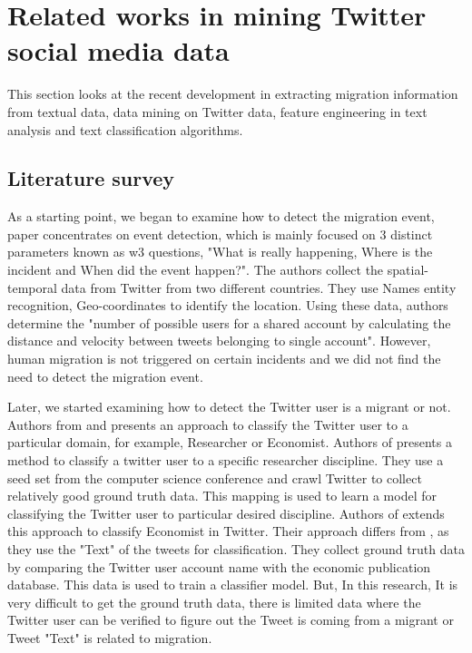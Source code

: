 


\section{Related works in mining Twitter social media data}

This section looks at the recent development in extracting migration information from textual data, data mining on Twitter data, feature engineering in text analysis and text classification algorithms.

\subsection{Literature survey}

As a starting point, we began to examine how to detect the migration event, \cite{Goergen} paper concentrates on event detection, which is mainly focused on 3 distinct parameters
known as w3 questions, "What is really happening, Where is the incident and When did the
event happen?". The authors collect the spatial-temporal data from Twitter from two different
countries. They use Names entity recognition, Geo-coordinates to identify the location. Using these
data, authors determine the "number of possible users for a shared account by calculating the
distance and velocity between tweets belonging to single account". However, human migration is not triggered on certain incidents and we did not find the need to detect the migration event. 

Later, we started examining how to detect the Twitter user is a migrant or not. Authors from \cite{Hadgu} and  \cite{Böhm2017} presents an approach to classify the Twitter user to a particular domain, for example, Researcher or Economist. Authors of \cite{Hadgu} presents a method to classify a twitter user to a specific researcher discipline. They use a seed set from the computer science conference and crawl Twitter to collect relatively good ground truth data. This mapping is used to learn a model for classifying the Twitter user to particular desired discipline. Authors of \cite{Böhm2017}  extends this approach to classify Economist in Twitter. Their approach differs from \cite{Hadgu}, as they use the "Text" of the tweets for classification. They collect ground truth data by comparing the Twitter user account name with the economic publication database. This data is used to train a classifier model. But, In this research, It is very difficult to get the ground truth data, there is limited data where the Twitter user can be verified to figure out the Tweet is coming from a migrant or Tweet "Text" is related to migration. 
 

